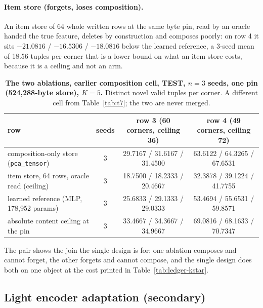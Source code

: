 \documentclass{article} %
\begin{document}
\paragraph{Item store (forgets, loses composition).} An item store of 64 whole written rows at
the same byte pin, read by an oracle handed the true feature, deletes by construction and
composes poorly: on row 4 it sits $-21.0816$ / $-16.5306$ / $-18.0816$ below the learned
reference, a 3-seed mean of 18.56 tuples per corner that is a lower bound on what an item store
costs, because it is a ceiling and not an arm. %

\begin{table}[t]
\centering\small
\caption{\textbf{The two ablations, earlier composition cell, TEST, $n=3$ seeds, one pin
(524,288-byte store), $K=5$.} Distinct novel valid tuples per corner. A different cell from
Table~\ref{tab:t7}; the two are never merged.}
\label{tab:ablations}
\setlength{\tabcolsep}{3pt}
\begin{tabular}{lccc}
\toprule
row & seeds & row 3 (60 corners, ceiling 36) & row 4 (49 corners, ceiling 72) \\
\midrule
composition-only store (\texttt{pca\_tensor}) & 3 & 29.7167 / 31.6167 / 31.4500 & 63.6122 / 64.3265 / 67.6531 \\
item store, 64 rows, oracle read (ceiling) & 3 & 18.7500 / 18.2333 / 20.4667 & 32.3878 / 39.1224 / 41.7755 \\
learned reference (MLP, 178,952 params) & 3 & 25.6833 / 29.1333 / 29.0333 & 53.4694 / 55.6531 / 59.8571 \\
absolute content ceiling at the pin & 3 & 33.4667 / 34.3667 / 34.9667 & 69.0816 / 68.1633 / 70.7347 \\
\bottomrule
\end{tabular}
\end{table}

\noindent The pair shows the join the single design is for: one ablation composes and cannot
forget, the other forgets and cannot compose, and the single design does both on one object at
the cost printed in Table~\ref{tab:ledger-kstar}.

\subsection{Light encoder adaptation (secondary)}
\label{sec:adapt}
\end{document}
